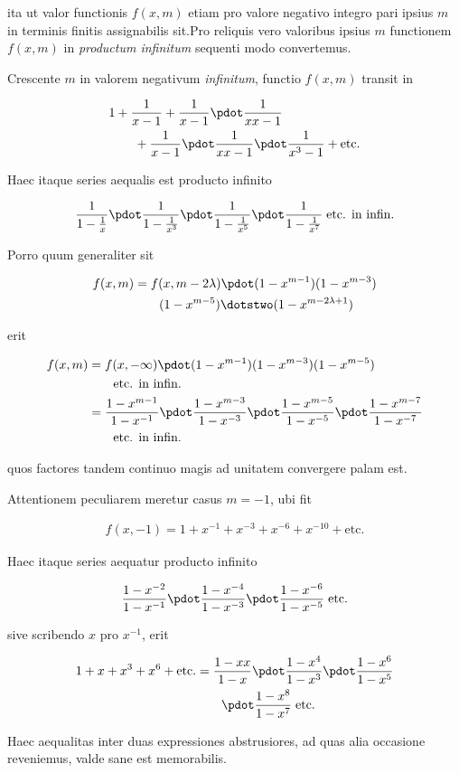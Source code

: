 ita ut valor functionis $f(x,m)$ etiam pro valore negativo integro pari ipsius $m$ in terminis finitis assignabilis sit.\quad Pro reliquis vero valoribus ipsius $m$ functionem $f(x,m)$ in \emph{productum infinitum} sequenti modo convertemus.

Crescente $m$ in valorem negativum \emph{infinitum}, functio $f(x,m)$ transit in

\[
\begin{aligned}
&1+\frac1{x-1}+\frac1{x-1}\pdot\frac1{xx-1}\\
&\qquad+\frac1{x-1}\pdot\frac1{xx-1}\pdot\frac1{x^3-1}+\text{etc.}
\end{aligned}
\]

Haec itaque series aequalis est producto infinito

\[
\begin{aligned}
\frac1{1-\frac1x}\pdot\frac1{1-\frac1{x^3}}\pdot\frac1{1-\frac1{x^5}}\pdot\frac1{1-\frac1{x^7}}\;\text{etc. in infin.}
\end{aligned}
\]

Porro quum generaliter sit

\[
\begin{aligned}
f(x,m)&=f(x,m-2\lambda)\pdot(1-x^{m-1})(1-x^{m-3})\\
&\qquad(1-x^{m-5})\dotstwo(1-x^{m-2\lambda+1})
\end{aligned}
\]

erit

\[
\begin{aligned}
f(x,m)&=f(x,-\infty)\pdot(1-x^{m-1})(1-x^{m-3})(1-x^{m-5})\\
&\qquad\text{etc. in infin.}\\
&=\frac{1-x^{m-1}}{1-x^{-1}}\pdot\frac{1-x^{m-3}}{1-x^{-3}}\pdot\frac{1-x^{m-5}}{1-x^{-5}}\pdot\frac{1-x^{m-7}}{1-x^{-7}}\\
&\qquad\text{etc. in infin.}
\end{aligned}
\]

quos factores tandem continuo magis ad unitatem convergere palam est.

Attentionem peculiarem meretur casus $m=-1$, ubi fit

\[
\begin{aligned}
f(x,-1)=1+x^{-1}+x^{-3}+x^{-6}+x^{-10}+\text{etc.}
\end{aligned}
\]

Haec itaque series aequatur producto infinito

\[
\begin{aligned}
\frac{1-x^{-2}}{1-x^{-1}}\pdot\frac{1-x^{-4}}{1-x^{-3}}\pdot\frac{1-x^{-6}}{1-x^{-5}}\;\text{etc.}
\end{aligned}
\]

sive scribendo $x$ pro $x^{-1}$, erit

\[
\begin{aligned}
1+x+x^3+x^6+\text{etc.}&=\frac{1-xx}{1-x}\pdot\frac{1-x^4}{1-x^3}\pdot\frac{1-x^6}{1-x^5}\\
&\qquad\pdot\frac{1-x^8}{1-x^7}\;\text{etc.}
\end{aligned}
\]

Haec aequalitas inter duas expressiones abstrusiores, ad quas alia occasione reveniemus, valde sane est memorabilis.


